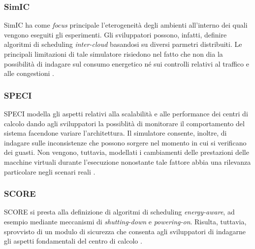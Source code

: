 {\subsubsection*{SimIC}
SimIC \cite{sotiriadis2013simic} ha come \emph{focus} principale l'eterogeneità degli ambienti all'interno dei quali vengono eseguiti gli esperimenti. Gli sviluppatori possono, infatti, definire algoritmi di scheduling \emph{inter-cloud} basandosi su diversi parmetri distribuiti. Le principali limitazioni di tale simulatore risiedono nel fatto che non dia la possibilità di indagare sul consumo energetico né sui controlli relativi al traffico e alle congestioni \cite{mansouri2020cloud}. 
\subsubsection*{SPECI}
SPECI \cite{sriram2009speci} modella gli aspetti relativi alla scalabilità e alle performance dei centri di calcolo dando agli sviluppatori la possiblità di monitorare il comportamento del sistema facendone variare l'architettura. Il simulatore consente, inoltre, di indagare sulle inconsistenze che possono sorgere nel momento in cui si verificano dei guasti. Non vengono, tuttavia, modellati i cambiamenti delle prestazioni delle macchine virtuali durante l'esecuzione nonostante tale fattore abbia una rilevanza particolare negli scenari reali \cite{mansouri2020cloud}.  
\subsubsection*{SCORE}
SCORE \cite{fernandez2018score} si presta alla definizione di algoritmi di scheduling \emph{energy-aware}, ad esempio mediante meccanismi di \emph{shutting-down} e \emph{powering-on}. Risulta, tuttavia, sprovvisto di un modulo di sicurezza che consenta agli sviluppatori di indagarne gli aspetti fondamentali del centro di calcolo \cite{mansouri2020cloud}. 
}
